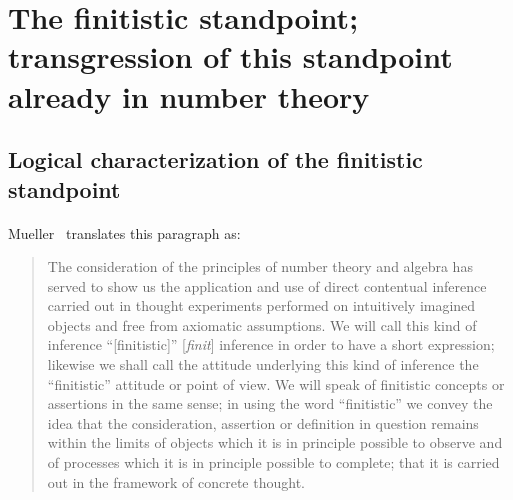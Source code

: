 \section{The finitistic standpoint; transgression of this standpoint already in number theory}

\subsection{Logical characterization of the finitistic standpoint}
\paragraph{} %

Mueller~\cite[p.44]{mueller2006grundlagen} translates this paragraph
as:
\begin{quote}
The consideration of the principles of number theory and algebra has
served to show us the application and use of direct contentual
inference carried out in thought experiments performed on intuitively
imagined objects and free from axiomatic assumptions. We will call
this kind of inference ``[finitistic]'' [\textit{finit\/}] inference
in order to have a short expression; likewise we shall call the
attitude underlying this kind of inference the ``finitistic'' attitude
or point of view. We will speak of finitistic concepts or assertions
in the same sense; in using the word ``finitistic'' we convey the idea
that the consideration, assertion or definition in question remains
within the limits of objects which it is in principle possible to
observe and of processes which it is in principle possible to
complete; that it is carried out in the framework of concrete thought.
\end{quote}

\paragraph{} %

\paragraph{} %

\paragraph{} %

\paragraph{} %

